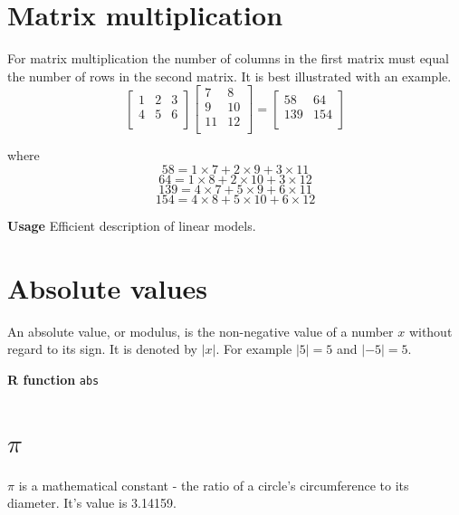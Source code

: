 \documentclass[
  oneside]{krantz}
\begin{document}
\hypertarget{matrix-multiplication}{%
\section{Matrix multiplication}\label{matrix-multiplication}}

For matrix multiplication the number of columns in the first matrix must equal the number of rows in the second matrix. It is best illustrated with an example.\\
\[
\left[\begin{array}
{ccc}
1 & 2 & 3 \\
4 & 5 & 6 \\
\end{array}\right] 
\left[\begin{array}
{cc}
7 & 8\\
9 & 10 \\
11 & 12 \\
\end{array}\right] 
= 
\left[\begin{array}
{cc}
58 & 64 \\
139 & 154 \\
\end{array}\right] 
\]

where
\[ 58 = 1 \times 7 + 2 \times 9 + 3 \times 11\]
\[ 64 = 1 \times 8 + 2 \times 10 + 3 \times 12\]
\[ 139 = 4 \times 7 + 5 \times 9 + 6 \times 11\]
\[ 154 = 4 \times 8 + 5 \times 10 + 6 \times 12\]

\textbf{Usage} Efficient description of linear models.

\hypertarget{absolute-values}{%
\section{Absolute values}\label{absolute-values}}

An absolute value, or modulus, is the non-negative value of a number \(x\) without regard to its sign. It is denoted by \(|x|\). For example \(|5| = 5\) and \(|-5| = 5\).

\textbf{R function} \texttt{abs}

\hypertarget{pi}{%
\section{\texorpdfstring{\(\pi\)}{\textbackslash pi}}\label{pi}}

\(\pi\) is a mathematical constant - the ratio of a circle's circumference to its diameter. It's value is 3.14159.
\end{document}
